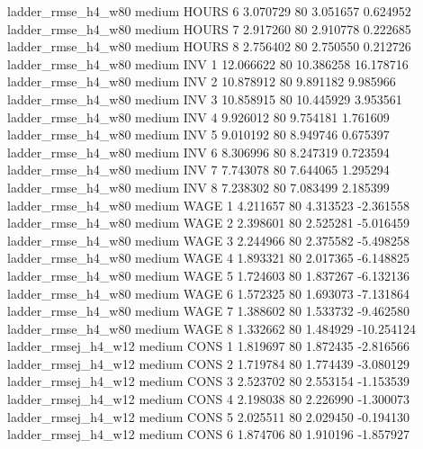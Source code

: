  ladder_rmse_h4_w80     medium    HOURS                 6  3.070729 80       3.051657           0.624952
 ladder_rmse_h4_w80     medium    HOURS                 7  2.917260 80       2.910778           0.222685
 ladder_rmse_h4_w80     medium    HOURS                 8  2.756402 80       2.750550           0.212726
 ladder_rmse_h4_w80     medium      INV                 1 12.066622 80      10.386258          16.178716
 ladder_rmse_h4_w80     medium      INV                 2 10.878912 80       9.891182           9.985966
 ladder_rmse_h4_w80     medium      INV                 3 10.858915 80      10.445929           3.953561
 ladder_rmse_h4_w80     medium      INV                 4  9.926012 80       9.754181           1.761609
 ladder_rmse_h4_w80     medium      INV                 5  9.010192 80       8.949746           0.675397
 ladder_rmse_h4_w80     medium      INV                 6  8.306996 80       8.247319           0.723594
 ladder_rmse_h4_w80     medium      INV                 7  7.743078 80       7.644065           1.295294
 ladder_rmse_h4_w80     medium      INV                 8  7.238302 80       7.083499           2.185399
 ladder_rmse_h4_w80     medium     WAGE                 1  4.211657 80       4.313523          -2.361558
 ladder_rmse_h4_w80     medium     WAGE                 2  2.398601 80       2.525281          -5.016459
 ladder_rmse_h4_w80     medium     WAGE                 3  2.244966 80       2.375582          -5.498258
 ladder_rmse_h4_w80     medium     WAGE                 4  1.893321 80       2.017365          -6.148825
 ladder_rmse_h4_w80     medium     WAGE                 5  1.724603 80       1.837267          -6.132136
 ladder_rmse_h4_w80     medium     WAGE                 6  1.572325 80       1.693073          -7.131864
 ladder_rmse_h4_w80     medium     WAGE                 7  1.388602 80       1.533732          -9.462580
 ladder_rmse_h4_w80     medium     WAGE                 8  1.332662 80       1.484929         -10.254124
ladder_rmsej_h4_w12     medium     CONS                 1  1.819697 80       1.872435          -2.816566
ladder_rmsej_h4_w12     medium     CONS                 2  1.719784 80       1.774439          -3.080129
ladder_rmsej_h4_w12     medium     CONS                 3  2.523702 80       2.553154          -1.153539
ladder_rmsej_h4_w12     medium     CONS                 4  2.198038 80       2.226990          -1.300073
ladder_rmsej_h4_w12     medium     CONS                 5  2.025511 80       2.029450          -0.194130
ladder_rmsej_h4_w12     medium     CONS                 6  1.874706 80       1.910196          -1.857927
